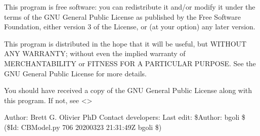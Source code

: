 \documentclass[letterpaper,12pt,english]{sphinxmanual}
\begin{document}
\sphinxAtStartPar
This program is free software: you can redistribute it and/or modify
it under the terms of the GNU General Public License as published by
the Free Software Foundation, either version 3 of the License, or
(at your option) any later version.

\sphinxAtStartPar
This program is distributed in the hope that it will be useful,
but WITHOUT ANY WARRANTY; without even the implied warranty of
MERCHANTABILITY or FITNESS FOR A PARTICULAR PURPOSE.  See the
GNU General Public License for more details.

\sphinxAtStartPar
You should have received a copy of the GNU General Public License
along with this program.  If not, see \textless{}\textgreater{}

\sphinxAtStartPar
Author: Brett G. Olivier PhD
Contact developers: 
Last edit: \$Author: bgoli \$ (\$Id: CBModel.py 706 2020\sphinxhyphen{}03\sphinxhyphen{}23 21:31:49Z bgoli \$)
\end{document}
